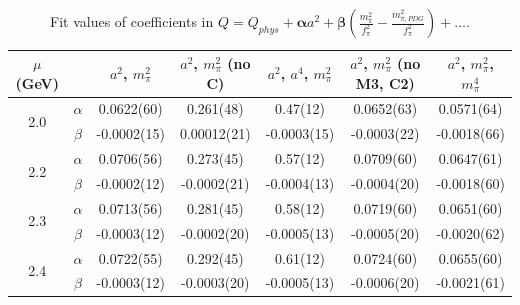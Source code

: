 \documentclass[12pt]{extarticle}
\begin{document}
\begin{table}[h!]
\begin{center}
\begin{tabular}{|c c|c|c|c|c|c|}
\hline
$\mu$ (GeV) &  & $a^2$, $m_\pi^2$& $a^2$, $m_\pi^2$ (no C)& $a^2$, $a^4$, $m_\pi^2$& $a^2$, $m_\pi^2$ (no M3, C2)& $a^2$, $m_\pi^2$, $m_\pi^4$\\
\hline
\multirow{2}{0.5in}{2.0} & $\alpha$ & 0.0622(60)& 0.261(48)& 0.47(12)& 0.0652(63)& 0.0571(64)\\
 & $\beta$ & -0.0002(15)& 0.00012(21)& -0.0003(15)& -0.0003(22)& -0.0018(66)\\
\hline
\multirow{2}{0.5in}{2.2} & $\alpha$ & 0.0706(56)& 0.273(45)& 0.57(12)& 0.0709(60)& 0.0647(61)\\
 & $\beta$ & -0.0002(12)& -0.0002(21)& -0.0004(13)& -0.0004(20)& -0.0018(60)\\
\hline
\multirow{2}{0.5in}{2.3} & $\alpha$ & 0.0713(56)& 0.281(45)& 0.58(12)& 0.0719(60)& 0.0651(60)\\
 & $\beta$ & -0.0003(12)& -0.0002(20)& -0.0005(13)& -0.0005(20)& -0.0020(62)\\
\hline
\multirow{2}{0.5in}{2.4} & $\alpha$ & 0.0722(55)& 0.292(45)& 0.61(12)& 0.0724(60)& 0.0655(60)\\
 & $\beta$ & -0.0003(12)& -0.0003(20)& -0.0005(13)& -0.0006(20)& -0.0021(61)\\
\hline
\end{tabular}
\caption{Fit values of coefficients in $Q = Q_{phys} + \mathbf{\alpha} a^2 + \mathbf{\beta}\left(\frac{m_\pi^2}{f_\pi^2}-\frac{m_{\pi,PDG}^2}{f_\pi^2}\right) + \ldots$.}
\end{center}
\end{table}




















\clearpage
\end{document}
